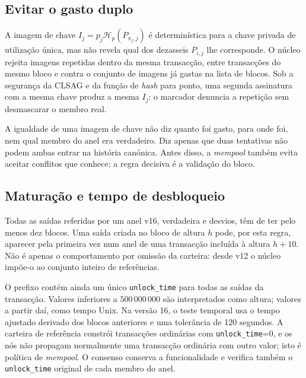 \subsection{Evitar o gasto duplo}

%
A imagem de chave \(I_j=p_j\mathcal H_p(P_{\pi_j,j})\) é determinística para
a chave privada de utilização única, mas não revela qual dos dezasseis
\(P_{i,j}\) lhe corresponde. O núcleo rejeita imagens repetidas dentro da
mesma transacção, entre transacções do mesmo bloco e contra o conjunto de
imagens já gastas na lista de blocos. Sob a segurança da CLSAG e da função de
\emph{hash} para ponto, uma segunda assinatura com a mesma chave produz a
mesma \(I_j\): o marcador denuncia a repetição sem desmascarar o membro real.

A igualdade de uma imagem de chave não diz quanto foi gasto, para onde foi,
nem qual membro do anel era verdadeiro. Diz apenas que duas tentativas não
podem ambas entrar na história canónica. Antes disso, a \emph{mempool}
também evita aceitar conflitos que conhece; a regra decisiva é a validação
do bloco.


\subsection{Maturação e tempo de desbloqueio}

Todas as saídas referidas por um anel v16, verdadeira e desvios, têm de ter
pelo menos dez blocos. Uma saída criada no bloco de altura \(h\) pode, por
esta regra, aparecer pela primeira vez num anel de uma transacção incluída à
altura \(h+10\). Não é apenas o comportamento por omissão da carteira: desde
v12 o núcleo impõe-o ao conjunto inteiro de referências.

%
O prefixo contém ainda um único \texttt{unlock\_time} para todas as saídas
da transacção. Valores inferiores a \(500\,000\,000\) são interpretados como
altura; valores a partir daí, como tempo Unix. Na versão 16, o teste temporal
usa o tempo ajustado derivado dos blocos anteriores e uma tolerância de 120
segundos. A carteira de referência constrói transacções ordinárias com
\texttt{unlock\_time}=0, e os nós não propagam normalmente uma transacção
ordinária com outro valor; isto é política de \emph{mempool}. O consenso
conserva a funcionalidade e verifica também o \texttt{unlock\_time} original
de cada membro do anel.

